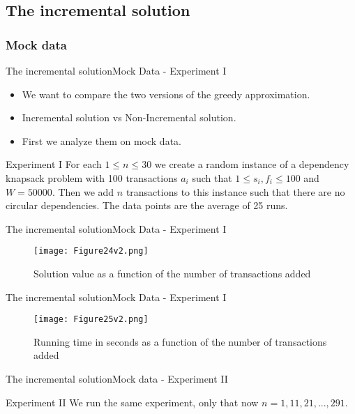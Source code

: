 \documentclass{beamer}
\begin{document}
\subsection*{The incremental solution}
\subsubsection*{Mock data}
\begin{frame}{The incremental solution}{Mock Data - Experiment I}
    \begin{itemize}
        \item {We want to compare the two versions of the greedy 
        approximation.}
        \item {Incremental solution vs Non-Incremental solution.}
        \item {First we analyze them on mock data.}
    \end{itemize}
    \begin {block}{Experiment I}
    For each $1\leq n \leq 30$ we create a random instance of a dependency 
    knapsack problem with 100 transactions $a_i$ such that 
    $1\leq s_i,f_i \leq 100$ and $W=50000$. Then we add $n$ transactions to 
    this instance such that there are no circular dependencies. The data 
    points are the average of 25 runs.
    \end{block}
\end{frame}

\begin{frame}{The incremental solution}{Mock Data - Experiment I}
    \begin{figure}
        \centering
        \texttt{[image: Figure24v2.png]}
        \caption{Solution value as a function of the number of 
        transactions added}
    \end{figure}
\end{frame}

\begin{frame}{The incremental solution}{Mock Data - Experiment I}
    \begin{figure}
        \centering
        \texttt{[image: Figure25v2.png]}
        \caption{Running time in seconds as a function of the number of 
        transactions added}
    \end{figure}
\end{frame}
\begin{frame}{The incremental solution}{Mock data - Experiment II}
    \begin{block}{Experiment II}
    We run the same experiment, only that now $n=1,11,21,...,291$.
    \end{block} 
\end{frame}
\end{document}

